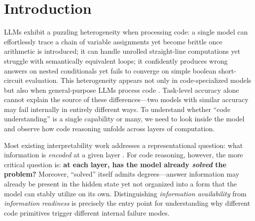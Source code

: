 \section{Introduction}
\label{sec:introduction}

LLMs exhibit a puzzling heterogeneity when processing code: a single model can effortlessly trace a chain of variable assignments yet become brittle once arithmetic is introduced; it can handle unrolled straight-line computations yet struggle with semantically equivalent loops; it confidently produces wrong answers on nested conditionals yet fails to converge on simple boolean short-circuit evaluation. This heterogeneity appears not only in code-specialized models but also when general-purpose LLMs process code \citep{liu2024codemind, gu2024cruxeval, abdollahi2025demystifying, chen2025reval}. Task-level accuracy alone cannot explain the source of these differences---two models with similar accuracy may fail internally in entirely different ways. To understand whether ``code understanding'' is a single capability or many, we need to look inside the model and observe how code reasoning unfolds across layers of computation.

Most existing interpretability work addresses a representational question: what information is \textit{encoded} at a given layer \citep{belinkov2017neural, cunningham2023sparse, nostalgebraist2020, belrose2023eliciting}. For code reasoning, however, the more critical question is: \textbf{at each layer, has the model already \textit{solved} the problem?} Moreover, ``solved'' itself admits degrees---answer information may already be present in the hidden state yet not organized into a form that the model can stably utilize on its own. Distinguishing \textit{information availability} from \textit{information readiness} is precisely the entry point for understanding why different code primitives trigger different internal failure modes.

